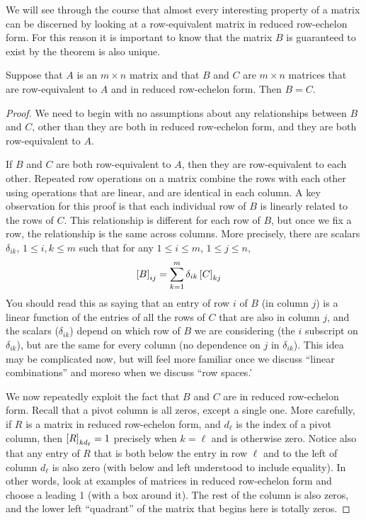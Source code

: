 \documentclass{ximera}
\begin{document}
We will see through the course that almost every interesting property
of a matrix can be discerned by looking at a row-equivalent matrix in
reduced row-echelon form.  For this reason it is important to know
that the matrix $B$ is guaranteed to exist by the theorem is also
unique.

\begin{theorem}
Suppose that $A$ is an $m\times n$ matrix and that $B$ and $C$ are $m\times n$ matrices that are row-equivalent to $A$ and in reduced row-echelon form.  Then $B=C$.

\begin{proof}
We need to begin with no assumptions about any relationships between $B$ and $C$, other than they are both in reduced row-echelon form, and they are both row-equivalent to $A$.

If $B$ and $C$ are both row-equivalent to $A$, then they are row-equivalent to each other.  Repeated row operations on a matrix combine the rows with each other using operations that are linear, and are identical in each column.  A key observation for this proof is that each individual row of $B$ is linearly related to the rows of $C$.  This relationship is different for each row of $B$, but once we fix a row, the relationship is the same across columns.  More precisely, there are scalars $\delta_{ik}$, $1\leq i,k\leq m$ such that for any $1\leq i\leq m$, $1\leq j\leq n$,
\begin{align*}
\left\lbrack B\right\rbrack_{ij}
&=\sum_{k=1}^{m}\delta_{ik}\left\lbrack C\right\rbrack_{kj}
\end{align*}
You should read this as saying that an entry of row $i$ of $B$ (in column $j$) is a linear function of the entries of all the rows of $C$ that are also in column $j$, and the scalars ($\delta_{ik}$) depend on which row of $B$ we are considering (the $i$ subscript on $\delta_{ik}$), but are the same for every column (no dependence on $j$ in $\delta_{ik}$).  This idea may be complicated now, but will feel more familiar once we discuss ``linear combinations'' and moreso when we discuss ``row spaces.'

We now repeatedly exploit the fact that $B$ and $C$ are in reduced row-echelon form.  Recall that a pivot column is all zeros, except a single one.  More carefully, if $R$ is a matrix in reduced row-echelon form, and $d_\ell$ is the index of a pivot column, then $\left\lbrack R\right\rbrack_{kd_\ell}=1$ precisely when $k=\ell$ and is otherwise zero.  Notice also that any entry of $R$ that is both below the entry in row $\ell$ and to the left of column $d_\ell$ is also zero (with below and left understood to include equality).  In other words, look at examples of matrices in reduced row-echelon form and choose a leading 1 (with a box around it).  The rest of the column is also zeros, and the lower left ``quadrant'' of the matrix that begins here is totally zeros.


\end{proof}
\end{theorem}
\end{document}
